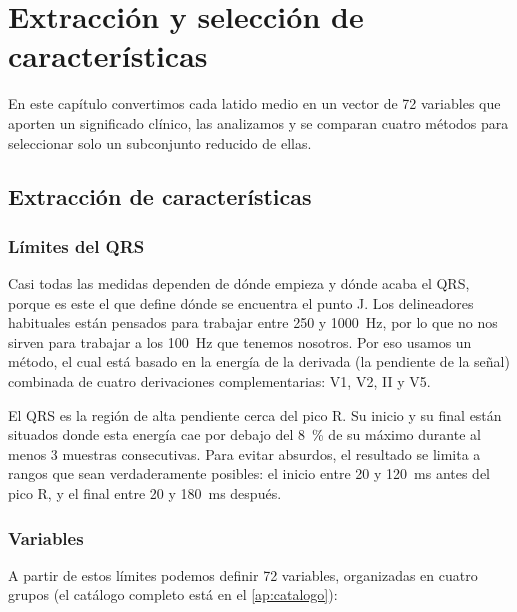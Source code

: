 \clearpage
\section{Extracción y selección de características}\label{cap:caracteristicas}

En este capítulo convertimos cada latido medio en un vector de 72 variables que aporten un significado clínico, las analizamos y se comparan cuatro métodos para seleccionar solo un subconjunto reducido de ellas.

\subsection{Extracción de características}

\subsubsection{Límites del QRS}

Casi todas las medidas dependen de dónde empieza y dónde acaba el QRS, porque es este el que define dónde se encuentra el punto J. Los delineadores habituales están pensados para trabajar entre 250 y \SI{1000}{\hertz}, por lo que no nos sirven para trabajar a los \SI{100}{\hertz} que tenemos nosotros. Por eso usamos un método, el cual está basado en la energía de la derivada (la pendiente de la señal) combinada de cuatro derivaciones complementarias: V1, V2, II y V5.

El QRS es la región de alta pendiente cerca del pico R. Su inicio y su final están situados donde esta energía cae por debajo del \SI{8}{\percent} de su máximo durante al menos 3 muestras consecutivas. Para evitar absurdos, el resultado se limita a rangos que sean verdaderamente posibles: el inicio entre \num{20} y \SI{120}{\milli\second} antes del pico R, y el final entre \num{20} y \SI{180}{\milli\second} después.

\subsubsection{Variables}

A partir de estos límites podemos definir 72 variables, organizadas en cuatro grupos (el catálogo completo está en el \cref{ap:catalogo}):

